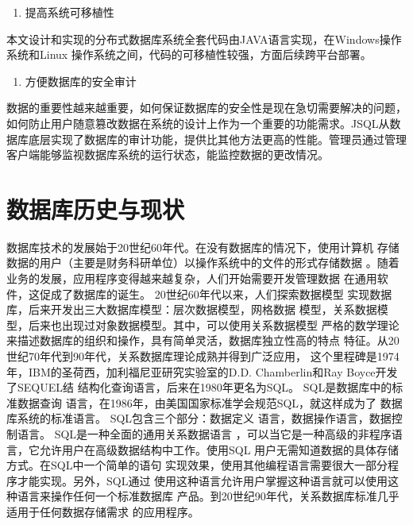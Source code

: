 	\begin{enumerate}[resume]
		\item 提高系统可移植性
	\end{enumerate}

	本文设计和实现的分布式数据库系统全套代码由JAVA语言实现，在Windows操作系统和Linux
	操作系统之间，代码的可移植性较强，方面后续跨平台部署。
	
	\begin{enumerate}[resume]
		\item 方便数据库的安全审计
	\end{enumerate}

	数据的重要性越来越重要，如何保证数据库的安全性是现在急切需要解决的问题，如何防止用户随意篡改数据在系统的设计上作为一个重要的功能需求。JSQL从数据库底层实现了数据库的审计功能，提供比其他方法更高的性能。管理员通过管理客户端能够监视数据库系统的运行状态，能监控数据的更改情况。
\section{数据库历史与现状}
数据库技术的发展始于20世纪60年代。在没有数据库的情况下，使用计算机
存储数据的用户（主要是财务科研单位）以操作系统中的文件的形式存储数据
。随着业务的发展，应用程序变得越来越复杂，人们开始需要开发管理数据
在通用软件，这促成了数据库的诞生。 20世纪60年代以来，人们探索数据模型
实现数据库，后来开发出三大数据库模型：层次数据模型，网格数据
模型，关系数据模型，后来也出现过对象数据模型。其中，可以使用关系数据模型
严格的数学理论来描述数据库的组织和操作，具有简单灵活，数据库独立性高的特点
特征。从20世纪70年代到90年代，关系数据库理论成熟并得到广泛应用，
这个里程碑是1974年，IBM的圣荷西，加利福尼亚研究实验室的D.D.
Chamberlin和Ray Boyce开发了SEQUEL结
结构化查询语言，后来在1980年更名为SQL。 SQL是数据库中的标准数据查询
语言，在1986年，由美国国家标准学会规范SQL，就这样成为了
数据库系统的标准语言。 SQL包含三个部分：数据定义
语言，数据操作语言，数据控制语言。 SQL是一种全面的通用关系数据语言
，可以当它是一种高级的非程序语言，它允许用户在高级数据结构中工作。使用SQL
用户无需知道数据的具体存储方式。在SQL中一个简单的语句
实现效果，使用其他编程语言需要很大一部分程序才能实现。另外，SQL通过
使用这种语言允许用户掌握这种语言就可以使用这种语言来操作任何一个标准数据库
产品。到20世纪90年代，关系数据库标准几乎适用于任何数据存储需求
的应用程序。

